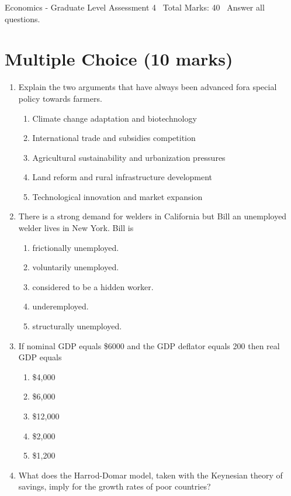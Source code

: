 \documentclass[12pt]{article}
\begin{document}
\begin{center}
Economics - Graduate Level Assessment 4 \
Total Marks: 40 \
Answer all questions.
\end{center}

\section*{Multiple Choice (10 marks)}
\begin{enumerate}[label=\arabic*.]
\item Explain the two arguments that have always been advanced fora special policy towards farmers.
\begin{enumerate}[label=(\alph*)]
    \item Climate change adaptation and biotechnology
    \item International trade and subsidies competition
    \item Agricultural sustainability and urbanization pressures
    \item Land reform and rural infrastructure development
    \item Technological innovation and market expansion
\end{enumerate}
\item There is a strong demand for welders in California but Bill an unemployed welder lives in New York. Bill is
\begin{enumerate}[label=(\alph*)]
    \item frictionally unemployed.
    \item voluntarily unemployed.
    \item considered to be a hidden worker.
    \item underemployed.
    \item structurally unemployed.
\end{enumerate}
\item If nominal GDP equals \$6000 and the GDP deflator equals 200 then real GDP equals
\begin{enumerate}[label=(\alph*)]
    \item \$4,000
    \item \$6,000
    \item \$12,000
    \item \$2,000
    \item \$1,200
\end{enumerate}
\item What does the Harrod-Domar model, taken with the Keynesian theory of savings, imply for the growth rates of poor countries?

\end{enumerate}
\end{document}
